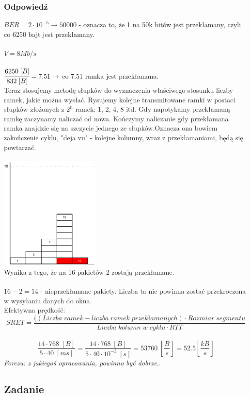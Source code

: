 		\subsubsection{Odpowiedź}
			$ BER=2\cdot 10^{-5} \rightarrow 50000 $ - oznacza to, że 1 na 50k bitów jest przekłamany, czyli co 6250 bajt jest przekłamany.\\\\
			$ V=8 Mb/s $\\\\
			$ \cfrac{6250\;[B]}{832\;[B]}=7.51 \rightarrow$ co 7.51 ramka jest przekłamana.\\
			Teraz stosujemy metodę słupków do wyznaczenia właściwego stosunku liczby ramek, jakie można wysłać. Rysujemy kolejne transmitowane ramki w postaci słupków złożonych z $ 2^n $ ramek: 1, 2, 4, 8 itd. Gdy napotykamy przekłamaną ramkę zaczynamy naliczać od nowa. Kończymy naliczanie gdy przekłamana ramka znajdzie się na szczycie jednego ze słupków.Oznacza ona bowiem zakończenie cyklu, "deja vu" - kolejne kolumny, wraz z przekłamaniami, będą się powtarzać.\\\\
			\includegraphics[width=5.0cm]{./images/zadanie07.pdf}\\
			Wynika z tego, że na 16 pakietów 2 zostają przekłamane.\\\\
			$ 16 - 2 = 14 $ - nieprzekłamane pakiety. Liczba ta nie powinna zostać przekroczona w wysyłaniu danych do okna.\\
			Efektywna prędkość:
			$$ SRET=\frac{((Liczba\;ramek - liczba\;ramek\;przekłamanych)\cdot Rozmiar\;segmentu}{Liczba\;kolumn\;w\;cyklu\cdot RTT} $$\\
			$$ \frac{14\cdot 768\;[B]}{5\cdot 40\;[ms]}=\frac{14\cdot 768\;[B]}{5\cdot 40\cdot 10^{-3}\;[s]}=53760\;[\frac{B}{s}]=52.5 [\frac{kB}{s}]$$
			\small{ \emph{Forczu: z jakiegoś opracowania, powinno być dobrze.}}.
	\subsection{Zadanie}
